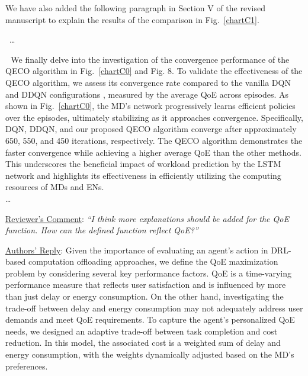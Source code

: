 \documentclass[12pt,draftclsnofoot,onecolumn]{IEEEtran}
\newcommand{\rev}[1]{{\color{blue}#1}} %
\newcommand{\rev}[1]{#1}
\newenvironment{my}[2]%
{\begin{list}{}%
{\setlength{\rightmargin}{#1}\setlength{\leftmargin}{#2}}%


 \item[]{}

} {\end{list}}
\begin{document}
\begin{enumerate}
We have also added the following paragraph in Section V of the revised manuscript to explain the results of the comparison in Fig.~\ref{chartC1}.
\begin{my}{1cm}{1cm}
	\rev{
		{\ 
			\dots 
			
			
			\,\,\,\,We finally delve into the investigation of the convergence performance of the QECO algorithm in Fig.~\ref{chartC0} and Fig. 8. To validate the effectiveness of the QECO algorithm, we assess its convergence rate compared to the vanilla DQN and DDQN configurations \cite{van2016deep}, measured by the average QoE across episodes. As shown in Fig.~\ref{chartC0}, the MD's network progressively learns efficient policies over the episodes, ultimately stabilizing as it approaches convergence. Specifically, DQN, DDQN, and our proposed QECO algorithm converge after approximately 650, 550, and 450 iterations, respectively. 
			The QECO algorithm demonstrates the faster convergence while achieving a higher average QoE than the other methods. This underscores the beneficial impact of workload prediction by the LSTM network and highlights its effectiveness in efficiently utilizing the computing resources of MDs and ENs.\\\dots }}
	
\end{my}

\vspace{6mm}




	\item \underline{Reviewer's Comment}: 
	\textit{``I think more explanations should be added for the QoE function. How can the defined function reflect QoE?''} \newline
	
	\underline{Authors' Reply}: Given the importance of evaluating an agent's action in DRL-based computation offloading approaches, we define the QoE maximization problem by considering several key performance factors. QoE is a time-varying performance measure that reflects user satisfaction and is influenced by more than just delay or energy consumption. On the other hand, investigating the trade-off between delay and energy consumption may not adequately address user demands and meet QoE requirements. To capture the agent’s personalized QoE needs, we designed an adaptive trade-off between task completion and cost reduction. In this model, the associated cost is a weighted sum of delay and energy consumption, with the weights dynamically adjusted based on the MD's preferences.\vspace{2mm}
	

\end{enumerate}
\end{document}
